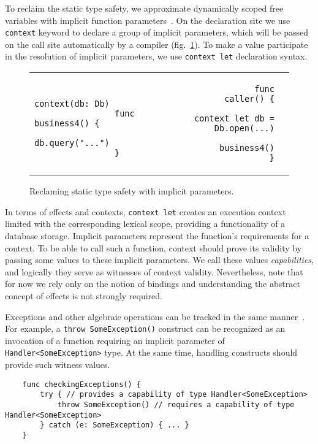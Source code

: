\documentclass[acmsmall]{acmart}
\begin{document}
To reclaim the static type safety, we approximate dynamically scoped free variables with implicit function parameters~\cite{lewis2000implicit}.
On the declaration site we use \texttt{context} keyword to declare a group of implicit parameters, which will be passed on the call site automatically by a compiler (fig.\ \ref{fig:implicits}).
To make a value participate in the resolution of implicit parameters, we use \texttt{context let} declaration syntax.

\begin{figure}[h]
    \begin{tabular}{p{} rl}
        \begin{minipage}[t]{0.3\textwidth}
            \begin{verbatim}
                context(db: Db)
                func business4() {
                    db.query("...")
                }
            \end{verbatim}
        \end{minipage}
        &
        \begin{minipage}[t]{0.3\textwidth}
            \begin{verbatim}
                func caller() {
                    context let db = Db.open(...)
                    business4()
                }
            \end{verbatim}
        \end{minipage}
    \end{tabular}
    \caption{Reclaming static type safety with implicit parameters.}
    \label{fig:implicits}
\end{figure}

In terms of effects and contexts, \texttt{context let} creates an execution context limited with the corresponding lexical scope, providing a functionality of a database storage.
Implicit parameters represent the function's requirements for a context.
To be able to call such a function, context should prove its validity by passing some values to these implicit parameters.
We call these values \textit{capabilities}, and logically they serve as witnesses of context validity.
Nevertheless, note that for now we rely only on the notion of bindings and understanding the abstract concept of effects is not strongly required.

Exceptions and other algebraic operations can be tracked in the same manner~\cite{odersky2021safer}.
For example, a \texttt{throw SomeException()} construct can be recognized as an invocation of a function requiring an implicit parameter of \texttt{Handler<SomeException>} type.
At the same time, handling constructs should provide such witness values.
\begin{verbatim}
    func checkingExceptions() {
        try { // provides a capability of type Handler<SomeException>
            throw SomeException() // requires a capability of type Handler<SomeException>
        } catch (e: SomeException) { ... }
    }
\end{verbatim}
\end{document}
